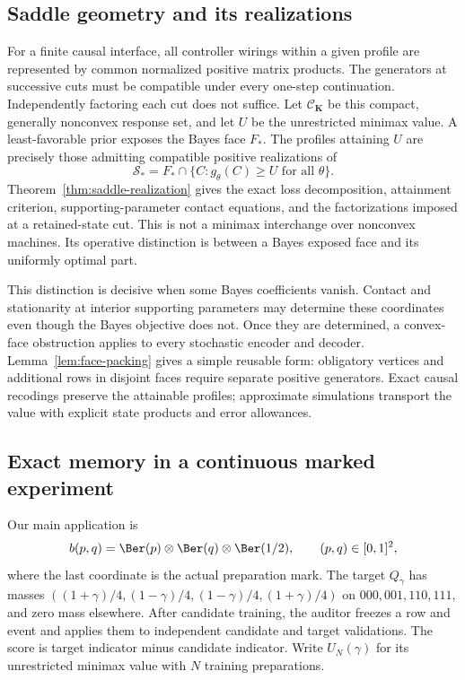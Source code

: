 \subsection{Saddle geometry and its realizations}
For a finite causal interface, all controller wirings within a given
profile are represented by common normalized positive matrix products.
The generators at successive cuts must be compatible under every
one-step continuation. Independently factoring each cut does not suffice.
Let $\mathcal C_{\mathbf K}$ be this compact, generally nonconvex
response set, and let $U$ be the unrestricted minimax value. A
least-favorable prior exposes the Bayes face $F_*$. The profiles attaining
$U$ are precisely those admitting compatible positive realizations of
\[
 \mathcal S_*=F_*\cap\{C:g_\theta(C)\ge U\text{ for all }\theta\}.
\]
Theorem~\ref{thm:saddle-realization} gives the exact loss decomposition,
attainment criterion, supporting-parameter contact equations, and the
factorizations imposed at a retained-state cut. This is not a minimax
interchange over nonconvex machines. Its operative distinction is between
a Bayes exposed face and its uniformly optimal part.

This distinction is decisive when some Bayes coefficients vanish.
Contact and stationarity at interior supporting parameters may determine
these coordinates even though the Bayes objective does not. Once they
are determined, a convex-face obstruction applies to every stochastic
encoder and decoder. Lemma~\ref{lem:face-packing} gives a simple reusable
form: obligatory vertices and additional rows in disjoint faces require
separate positive generators. Exact causal recodings preserve the
attainable profiles; approximate simulations transport the value with
explicit state products and error allowances.

\subsection{Exact memory in a continuous marked experiment}
Our main application is
\[
 b(p,q)=\Ber(p)\otimes\Ber(q)\otimes\Ber(1/2),\qquad(p,q)\in[0,1]^2,
\]
where the last coordinate is the actual preparation mark. The target
$Q_\gamma$ has masses
$((1+\gamma)/4,(1-\gamma)/4,(1-\gamma)/4,(1+\gamma)/4)$ on
$000,001,110,111$, and zero mass elsewhere. After candidate training,
the auditor freezes a row and event and applies them to independent
candidate and target validations. The score is target indicator minus
candidate indicator. Write $U_N(\gamma)$ for its unrestricted minimax
value with $N$ training preparations.

